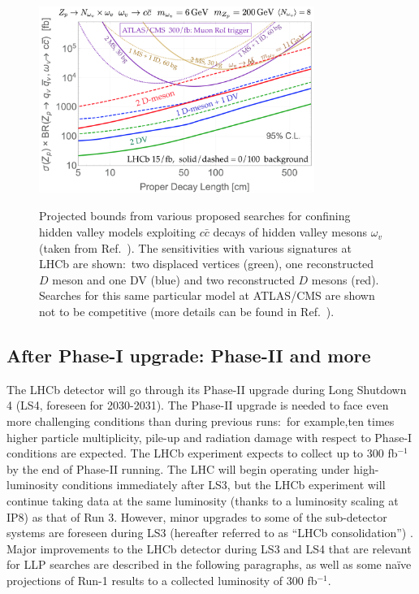 \begin{figure}[t]
  \centering
  {\includegraphics[width=0.8\textwidth]{figures/lhcb_hvlimits2.png}}
  \caption{Projected bounds from various proposed searches for confining hidden valley models exploiting $c\bar{c}$ decays of hidden valley mesons $\omega_v$ (taken from Ref.~\cite{Pierce:2017taw}). The sensitivities with various signatures at LHCb are shown:~two displaced vertices (green), one reconstructed $D$ meson and one DV (blue) and two reconstructed $D$ mesons (red). Searches for this same particular model at ATLAS/CMS are shown not to be competitive (more details can be found in Ref.~\cite{Pierce:2017taw}).}
  \label{fig:HVlim}
\end{figure}

\subsection{After Phase-I upgrade: Phase-II and more}
\label{sec:ulhcbphaseii}

The LHCb detector will go through its Phase-II upgrade during Long Shutdown 4 (LS4, foreseen for 2030-2031). The Phase-II upgrade is needed to face even more challenging conditions than during previous runs:~for example,ten times higher particle multiplicity, pile-up and radiation damage with respect to Phase-I conditions are expected. The LHCb experiment expects to collect up to 300 fb$^{-1}$ by the end of Phase-II running. The LHC will begin operating under high-luminosity conditions immediately after LS3, but the LHCb experiment will continue taking data at the same luminosity (thanks to a luminosity scaling at IP8) as that of Run 3. However, minor upgrades to some of the sub-detector systems are foreseen during LS3 (hereafter referred to as ``LHCb consolidation'') \cite{Aaij:2244311}. Major improvements to the LHCb detector during LS3 and LS4 that are relevant for LLP searches are described in the following paragraphs, as well as some na\"ive projections of Run-1 results to a collected luminosity of 300 fb$^{-1}$. 

